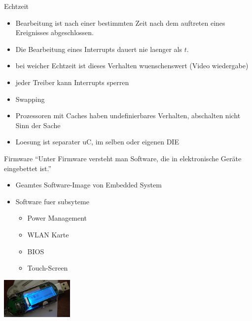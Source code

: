 \begin{frame}{Echtzeit}
	\begin{itemize}
		\item Bearbeitung ist nach einer bestimmten Zeit nach dem auftreten eines Ereignisses abgeschlossen.
		\item Die Bearbeitung eines Interrupts dauert nie laenger als $t$.
		\item bei weicher Echtzeit ist dieses Verhalten wuenschenswert (Video wiedergabe)
		\item jeder Treiber kann Interrupts sperren
		\item Swapping
		\item Prozessoren mit Caches haben undefinierbares Verhalten, abschalten nicht Sinn der Sache
		\item Loesung ist separater uC, im selben oder eigenen DIE
	\end{itemize}
\end{frame}

\begin{frame}{Firmware}
	``Unter Firmware versteht man Software, die in elektronische Geräte eingebettet ist.'' \cite{wikiFirmware}
	
	\begin{itemize}
		\item Geamtes Software-Image von Embedded System
		\item Software fuer subsyteme
		\begin{itemize}
			\item Power Management
			\item WLAN Karte
			\item BIOS
			\item Touch-Screen
		\end{itemize}
	\end{itemize}
	
	\includegraphics[height=2cm]{res/Firmware_upgrade.jpg} \cite{firmwareUpgrade}
\end{frame}

